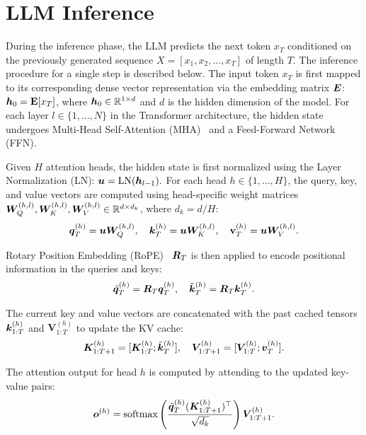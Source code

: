 
\section{LLM Inference}
\label{app:llm_inference}

During the inference phase, the LLM predicts the next token $x_{T}$ conditioned on the previously generated sequence $X = [x_1, x_2, ..., x_T]$ of length $T$. The inference procedure for a single step is described below.
% 
The input token $x_{T}$ is first mapped to its corresponding dense vector representation via the embedding matrix $\bm{E}$: $\bm{h}_0 = \mathbf{E}[x_{T}]$, where $\bm{h}_0 \in \mathbb{R}^{1 \times d}$ and $d$ is the hidden dimension of the model.
% 
For each layer $l \in \{1, \dots, N\}$ in the Transformer architecture, the hidden state undergoes Multi-Head Self-Attention (MHA)~\cite{vaswani2017attention} and a Feed-Forward Network (FFN).

Given $H$ attention heads, the hidden state is first normalized using the Layer Normalization (LN): $\bm{u} = \text{LN}(\bm{h}_{l-1}).$
% 
For each head $h \in \{1, \dots, H\}$, the query, key, and value vectors are computed using head-specific weight matrices $\bm{W}_Q^{(h,l)}, \bm{W}_K^{(h,l)}, \bm{W}_V^{(h,l)} \in \mathbb{R}^{d \times d_k}$, where $d_k = d/H$:
\begin{align}
    \bm{q}_{T}^{(h)} = \bm{u} \bm{W}_Q^{(h,l)},\quad \bm{k}_{T}^{(h)} = \bm{u} \bm{W}_K^{(h,l)},\quad \mathbf{v}_{T}^{(h)} = \bm{u} \bm{W}_V^{(h,l)}.
\end{align}

Rotary Position Embedding (RoPE)~\cite{su2024roformer} $\bm{R}_{T}$ is then applied to encode positional information in the queries and keys:
\begin{align}
    \tilde{\bm{q}}_{T}^{(h)} = \bm{R}_{T} \bm{q}_{T}^{(h)},\quad \tilde{\bm{k}}_{T}^{(h)} = \bm{R}_{T} \bm{k}_{T}^{(h)}.
\end{align}

The current key and value vectors are concatenated with the past cached tensors $\bm{k}_{1:T}^{(h)}$ and $\mathbf{V}_{1:T}^{(h)}$ to update the KV cache:
\begin{align}
    \bm{K}_{1:T+1}^{(h)} = [\bm{K}_{1:T}^{(h)}; \tilde{\bm{k}}_{T}^{(h)}],\quad \bm{V}_{1:T+1}^{(h)} = [\bm{V}_{1:T}^{(h)}; \bm{v}_{T}^{(h)}].
\end{align}

The attention output for head $h$ is computed by attending to the updated key-value pairs:
\begin{align}
    \bm{o}^{(h)} = \text{softmax} \left( \frac{\tilde{\bm{q}}_{T}^{(h)} (\bm{K}_{1:T+1}^{(h)})^\top}{\sqrt{d_k}} \right) \bm{V}_{1:T+1}^{(h)}.
\end{align}

